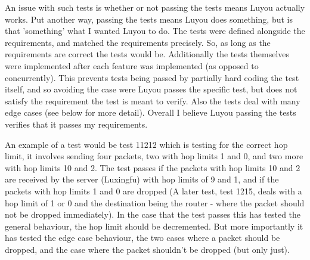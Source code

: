 \documentclass[12pt,a4paper,twoside,openany]{report}
\begin{document}
\bigskip

An issue with such tests is whether or not passing the tests means Luyou actually works. Put another way, passing the tests means Luyou does something, but is that 'something' what I wanted Luyou to do.  The tests were defined alongside the requirements, and matched the requirements precisely.  So, as long as the requirements are correct the tests would be.  Additionally the tests themselves were implemented after each feature was implemented (as opposed to concurrently).  This prevents tests being passed by partially hard coding the test itself, and so avoiding the case were Luyou passes the specific test, but does not satisfy the requirement the test is meant to verify. Also the tests deal with many edge cases (see below for more detail). Overall I believe Luyou passing the tests verifies that it passes my requirements.

\bigskip

An example of a test would be test 11212 which is testing for the correct hop limit, it involves sending four packets, two with hop limits 1 and 0, and two more with hop limits 10 and 2.  The test passes if the packets with hop limits 10 and 2 are received by the server (Luxingfu) with hop limits of 9 and 1, and if the packets with hop limits 1 and 0 are dropped (A later test, test 1215, deals with a hop limit of 1 or 0 and the destination being the router - where the packet should not be dropped immediately).  In the case that the test passes this has tested the general behaviour, the hop limit should be decremented. But more importantly it has tested the edge case behaviour, the two cases where a packet should be dropped, and the case where the packet shouldn't be dropped (but only just).

\bigskip
\end{document}
